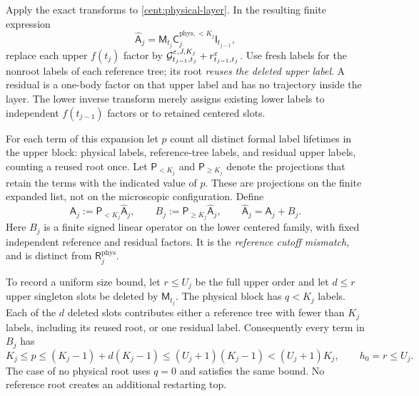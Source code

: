 Apply the exact transforms to \eqref{cent:physical-layer}. In the
resulting finite expression
\[
 \widehat{\mathsf A}_j
   =\mathsf M_{t_j}\mathsf C_j^{\mathrm{phys},<K_j}
                               \mathsf I_{t_{j-1}},
\]
replace each upper $f(t_j)$ factor by
$\mathcal G_{t_{j-1},t_j}^{\varepsilon,J,K_j}+r_{t_{j-1},t_j}^{\varepsilon}$.
Use fresh labels for the nonroot labels of each reference tree; its
root \emph{reuses the deleted upper label}. A residual is a one-body
factor on that upper label and has no trajectory inside the layer.
The lower inverse transform merely assigns existing lower labels to
independent $f(t_{j-1})$ factors or to retained centered slots.

For each term of this expansion let $p$ count all distinct formal
label lifetimes in the upper block: physical labels, reference-tree
labels, and residual upper labels, counting a reused root once.
Let $\mathsf P_{<K_j}$ and $\mathsf P_{\geq K_j}$ denote the
projections that retain the terms with the indicated value of $p$.
These are projections on the finite expanded list, not on the
microscopic configuration. Define
\begin{equation}\label{cent:reference-mismatch}
 \mathsf A_j:=\mathsf P_{<K_j}\widehat{\mathsf A}_j,
 \qquad
 B_j:=\mathsf P_{\geq K_j}\widehat{\mathsf A}_j,
 \qquad \widehat{\mathsf A}_j=\mathsf A_j+B_j.
\end{equation}
Here $B_j$ is a finite signed linear operator on the lower centered
family, with fixed independent reference and residual factors.
It is the \emph{reference cutoff mismatch}, and is distinct from
$\mathsf R_j^{\mathrm{phys}}$.

To record a uniform size bound, let $r\leq U_j$ be the full upper
order and let $d\leq r$ upper singleton slots be deleted by
$\mathsf M_{t_j}$. The physical block has $q<K_j$ labels. Each of
the $d$ deleted slots contributes either a reference tree with fewer
than $K_j$ labels, including its reused root, or one residual label.
Consequently every term in $B_j$ has
\begin{equation}\label{cent:mismatch-size}
 K_j\leq p\leq (K_j-1)+d(K_j-1)
             \leq(U_j+1)(K_j-1)<(U_j+1)K_j,
 \qquad h_0=r\leq U_j.
\end{equation}
The case of no physical root uses $q=0$ and satisfies the same bound.
No reference root creates an additional restarting top.

